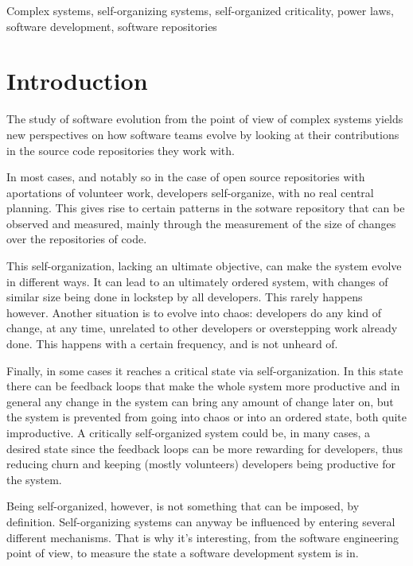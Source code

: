 \documentclass[conference]{IEEEtran}
\begin{document}
\begin{IEEEkeywords}
  Complex systems, self-organizing systems, self-organized
  criticality, power laws, software development, software repositories
\end{IEEEkeywords}


\section{Introduction}\label{introduction}

The study of software evolution from the point of view of complex
systems yields new perspectives on how software teams evolve by
looking at their contributions in the source code repositories they
work with.

In most cases, and notably so in the case of open source repositories
with aportations of volunteer work, developers self-organize, with no
real central planning. This gives rise to certain patterns in the
sotware repository that can be observed and measured, mainly through
the measurement of the size of changes over the repositories of code.

This self-organization, lacking an ultimate objective, can make the
system evolve in different ways. It can lead to an ultimately ordered
system, with changes of similar size being done in lockstep by all
developers. This rarely happens however. Another situation is to
evolve into chaos: developers do any kind of change, at any time,
unrelated to other developers or overstepping work already done. This
happens with a certain frequency, and is not unheard of.

Finally, in some cases it reaches a critical state via
self-organization. In this state there can be feedback loops that make
the whole system more productive and in general any change in the
system can bring any amount of change later on, but the system is
prevented from going into chaos or into an ordered state, both quite
improductive. A critically self-organized system could be, in many
cases, a desired state since the feedback loops can be more rewarding
for developers, thus reducing churn and keeping (mostly volunteers)
developers being productive for the system.

Being self-organized, however, is not something that can be imposed,
by definition. Self-organizing systems can anyway be influenced by
entering several different mechanisms. That is why it's interesting,
from the software engineering point of view, to measure the state a
software development system is in.
\end{document}
